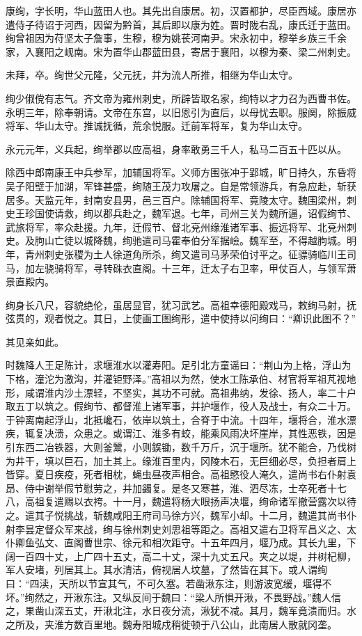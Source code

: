 \documentclass[12pt,UTF8]{ctexbook}
\begin{document}
康绚，字长明，华山蓝田人也。其先出自康居。初，汉置都护，尽臣西域。康居亦遣侍子待诏于河西，因留为黔首，其后即以康为姓。晋时陇右乱，康氏迁于蓝田。绚曾祖因为苻坚太子詹事，生穆，穆为姚苌河南尹。宋永初中，穆举乡族三千余家，入襄阳之岘南。宋为置华山郡蓝田县，寄居于襄阳，以穆为秦、梁二州刺史。

未拜，卒。绚世父元隆，父元抚，并为流人所推，相继为华山太守。

绚少俶傥有志气。齐文帝为雍州刺史，所辟皆取名家，绚特以才力召为西曹书佐。永明三年，除奉朝请。文帝在东宫，以旧恩引为直后，以母忧去职。服阕，除振威将军、华山太守。推诚抚循，荒余悦服。迁前军将军，复为华山太守。

永元元年，义兵起，绚举郡以应高祖，身率敢勇三千人，私马二百五十匹以从。

除西中郎南康王中兵参军，加辅国将军。义师方围张冲于郢城，旷日持久，东昏将吴子阳壁于加湖，军锋甚盛，绚随王茂力攻屠之。自是常领游兵，有急应赴，斩获居多。天监元年，封南安县男，邑三百户。除辅国将军、竟陵太守。魏围梁州，刺史王珍国使请救，绚以郡兵赴之，魏军退。七年，司州三关为魏所逼，诏假绚节、武旅将军，率众赴援。九年，迁假节、督北兗州缘淮诸军事、振远将军、北兗州刺史。及朐山亡徒以城降魏，绚驰遣司马霍奉伯分军据嶮。魏军至，不得越朐城。明年，青州刺史张稷为土人徐道角所杀，绚又遣司马茅荣伯讨平之。征骠骑临川王司马，加左骁骑将军，寻转硃衣直阁。十三年，迁太子右卫率，甲仗百人，与领军萧景直殿内。

绚身长八尺，容貌绝伦，虽居显官，犹习武艺。高祖幸德阳殿戏马，敕绚马射，抚弦贯的，观者悦之。其日，上使画工图绚形，遣中使持以问绚曰：“卿识此图不？”

其见亲如此。

时魏降人王足陈计，求堰淮水以灌寿阳。足引北方童谣曰：“荆山为上格，浮山为下格，潼沱为激沟，并灌钜野泽。”高祖以为然，使水工陈承伯、材官将军祖芃视地形，咸谓淮内沙土漂轻，不坚实，其功不可就。高祖弗纳，发徐、扬人，率二十户取五丁以筑之。假绚节、都督淮上诸军事，并护堰作，役人及战士，有众二十万。于钟离南起浮山，北抵巉石，依岸以筑土，合脊于中流。十四年，堰将合，淮水漂疾，辄复决溃，众患之。或谓江、淮多有蛟，能乘风雨决坏崖岸，其性恶铁，因是引东西二冶铁器，大则釜鬵，小则鋘锄，数千万斤，沉于堰所。犹不能合，乃伐树为井干，填以巨石，加土其上。缘淮百里内，冈陵木石，无巨细必尽，负担者肩上皆穿。夏日疾疫，死者相枕，蝇虫昼夜声相合。高祖愍役人淹久，遣尚书右仆射袁昂、侍中谢举假节慰劳之，并加蠲复。是冬又寒甚，淮、泗尽冻，士卒死者十七八，高祖复遣赐以衣袴。十一月，魏遣将杨大眼扬声决堰，绚命诸军撤营露次以待之。遣其子悦挑战，斩魏咸阳王府司马徐方兴，魏军小却。十二月，魏遣其尚书仆射李昙定督众军来战，绚与徐州刺史刘思祖等距之。高祖又遣右卫将军昌义之、太仆卿鱼弘文、直阁曹世宗、徐元和相次距守。十五年四月，堰乃成。其长九里，下阔一百四十丈，上广四十五丈，高二十丈，深十九丈五尺。夹之以堤，并树杞柳，军人安堵，列居其上。其水清洁，俯视居人坟墓，了然皆在其下。或人谓绚曰：“四渎，天所以节宣其气，不可久塞。若凿湫东注，则游波宽缓，堰得不坏。”绚然之，开湫东注。又纵反间于魏曰：“梁人所惧开湫，不畏野战。”魏人信之，果凿山深五丈，开湫北注，水日夜分流，湫犹不减。其月，魏军竟溃而归。水之所及，夹淮方数百里地。魏寿阳城戍稍徙顿于八公山，此南居人散就冈垄。
\end{document}
